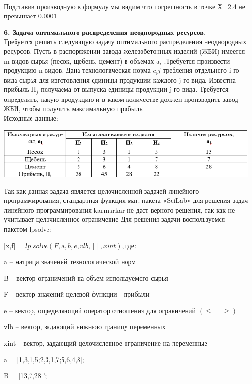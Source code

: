\documentclass[russian,utf8,nocolumxxxi,nocolumnxxxii]{eskdtext}
\begin{document}
\\Подставив производную в формулу мы видим что погрешность в точке Х=2.4 не превышает 0.0001
\newpage 
\par 
\normalsize 
{\bf6. Задача оптимального распределения неоднородных ресурсов.}\\ 
Требуется решить следующую задачу оптимального распределения неоднородных ресурсов. Пусть в распоряжении завода железобетонных изделий (ЖБИ) имеется m видов сырья (песок, щебень, цемент) в объемах $ a_i$ .Требуется произвести продукцию n видов. Дана технологическая норма $c_ij$ требления отдельного i-го вида сырья для изготовления единицы продукции каждого j-го вида. Известна прибыль $П_j$ получаема от выпуска единицы продукции j-го вида. Требуется определить, какую продукцию и в каком количестве должен производить завод ЖБИ, чтобы получить максимальную прибыль.\\ 
Исходные данные:\\ 

\begin{center} 
\includegraphics[scale=1]{1} 
\end{center} 
Так как данная задача является целочисленной задачей линейного программирования, стандартная функция мат. пакета «SciLab» для решения задач линейного программирования karmarkar не даст верного решения, так как не учитывает целочисленное ограничение 
Для решения задачи воспользуемся пакетом lpsolve: 

[x,f] = $lp\_solve(F,a,b,e,vlb,[],xint), где:$ 

a – матрица значений технологической норм 

B – вектор ограничений на объем используемого сырья 

F – вектор значений целевой функции - прибыли 

e – вектор, определяющий оператор отношения для ограничений $(\leq = \geq)$ 

vlb – вектор, задающий нижнюю границу переменных 

xint – вектор, задающий целочисленное ограничение на переменные 


a = [1,3,1,5;2,3,1,7;5,6,4,8]; 

B = [13,7,28]’; 
\end{document}
